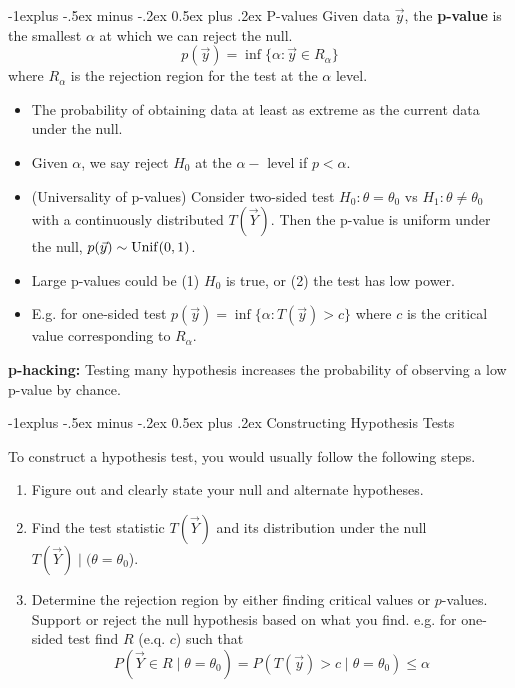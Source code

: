 \documentclass[10pt,landscape]{article}
\makeatletter
\renewcommand{\subsection}{\@startsection{subsection}{2}{0mm}%
                                {-1explus -.5ex minus -.2ex}%
                                {0.5ex plus .2ex}%
                                {\normalfont\normalsize\bfseries}}
\makeatother
\begin{document}
\begin{multicols*}{3}
\subsection{P-values}
Given data $\vec{y}$, the \textbf{p-value} is the smallest $\alpha$ at which we can reject the null.
$$
p(\vec{y})=\inf\{\alpha:\vec{y}\in R_\alpha\}
$$
where $R_\alpha$ is the rejection region for the test at the $\alpha$ level.
\begin{itemize}
    \item The probability of obtaining data at least as extreme as the current data under the null.
    \item Given $\alpha$, we say reject $H_0$ at the $\alpha-$ level if $p<\alpha$.
    \item (Universality of p-values) Consider two-sided test $H_0:\theta=\theta_0$ vs $H_1:\theta\neq\theta_0$ with a continuously distributed $T(\vec{Y})$. Then the p-value is uniform under the null, $p(\vec{y})\sim\operatorname{Unif}(0,1)$.
    \item Large p-values could be (1) $H_0$ is true, or (2) the test has low power.
    \item E.g. for one-sided test $p(\vec{y})=\inf\{\alpha:T(\vec{y})>c\}$ where $c$ is the critical value corresponding to $R_\alpha$.
\end{itemize}
\textbf{p-hacking: }Testing many hypothesis increases the probability of observing a low p-value by chance.

\subsection{Constructing Hypothesis Tests}

To construct a hypothesis test, you would usually follow the following steps.
\begin{enumerate}
    \item Figure out and clearly state your null and alternate hypotheses.
    \item  Find the test statistic $T(\vec{Y})$ and its distribution under the null $T(\vec{Y})\mid (\theta = \theta_0$).
    \item Determine the rejection region by either finding critical values or $p$-values. Support or reject the null hypothesis based on what you find. e.g. for one-sided test find $R$ (e.q. $c$) such that
    $$
    P(\vec{Y}\in R\mid\theta=\theta_0)=P(T(\vec{y})>c\mid\theta=\theta_0)\leq \alpha
    $$
\end{enumerate}


\end{multicols*}
\end{document}
